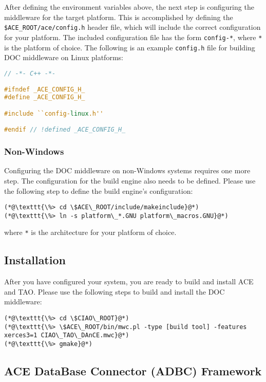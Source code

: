 After defining the environment variables above, the next step is 
configuring the middleware for the target platform. This is accomplished by 
defining the \texttt{\$ACE\_ROOT/ace/config.h} header file, which will include the correct 
configuration for your platform. The included configuration file has the 
form \texttt{config-*}, where \texttt{*} is the platform of choice.
The following is an example \texttt{config.h} file for building DOC middleware 
on Linux platforms:
\begin{lstlisting}[language=C++]
// -*- C++ -*-

#ifndef _ACE_CONFIG_H_
#define _ACE_CONFIG_H_

#include ``config-linux.h''

#endif // !defined _ACE_CONFIG_H_
\end{lstlisting}

\subsubsection{Non-Windows}
Configuring the DOC middleware on non-Windows systems requires one more 
step. The configuration for the build engine also needs to be defined. 
Please use the following step to define the build engine's configuration:
\begin{lstlisting}
(*@\texttt{\%> cd \$ACE\_ROOT/include/makeinclude}@*)
(*@\texttt{\%> ln -s platform\_*.GNU platform\_macros.GNU}@*)
\end{lstlisting}
where \texttt{*} is the architecture for your platform of choice.

\subsection{Installation}

After you have configured your system, you are ready to build and 
install ACE and TAO. Please use the following steps to build and 
install the DOC middleware:
\begin{lstlisting}
(*@\texttt{\%> cd \$CIAO\_ROOT}@*)
(*@\texttt{\%> \$ACE\_ROOT/bin/mwc.pl -type [build tool] -features xerces3=1 CIAO\_TAO\_DAnCE.mwc}@*)
(*@\texttt{\%> gmake}@*)
\end{lstlisting}

\subsection{ACE DataBase Connector (ADBC) Framework}
\label{sec:thirdparty-adbc}

